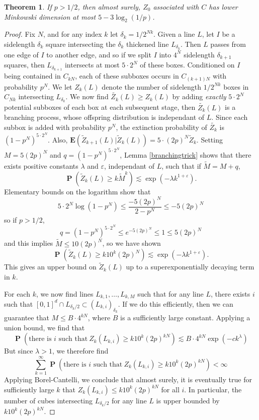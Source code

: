 \documentclass[dvipsnames,letterpaper,12pt]{article}
\numberwithin{equation}{section}
\theoremstyle{plain}
\newtheorem{theorem}{Theorem}
\DeclareMathOperator{\Prob}{\mathbf{P}}
\begin{document}
\begin{theorem}
	If $p > 1/2$, then almost surely, $Z_0$ associated with $C$ has lower Minkowski dimension at most $5 - 3 \log_2(1/p)$.
\end{theorem}
\begin{proof}
	Fix $N$, and for any index $k$ let $\delta_k = 1/2^{Nk}$. Given a line $L$, let $I$ be a sidelength $\delta_k$ square intersecting the $\delta_k$ thickened line $L_{\delta_k}$. Then $L$ passes from one edge of $I$ to another edge, and so if we split $I$ into $4^N$ sidelength $\delta_{k+1}$ squares, then $L_{\delta_{k+1}}$ intersects at most $5 \cdot 2^N$ of these boxes. Conditioned on $I$ being contained in $C_{kN}$, each of these subboxes occurs in $C_{(k+1)N}$ with probability $p^N$. We let $Z_k(L)$ denote the number of sidelength $1/2^{Nk}$ boxes in $C_{Nk}$ intersecting $L_{\delta_k}$. We now find $\tilde{Z_k}(L) \geq Z_k(L)$ by adding {\it exactly} $5 \cdot 2^N$ potential subboxes of each box at each subsequent stage, then $\tilde{Z_k}(L)$ is a branching process, whose offspring distribution is independant of $L$. Since each subbox is added with probability $p^N$, the extinction probability of $\tilde{Z_k}$ is $(1 - p^N)^{5 \cdot 2^N}$. Also, $\mathbf{E}(\tilde{Z}_{k+1}(L)|\tilde{Z}_k(L)) = 5 \cdot (2p)^N \tilde{Z}_k$.  Setting $M = 5 (2p)^N$ and $q = (1 - p^N)^{5 \cdot 2^N}$, Lemma \ref{branchingtrick} shows that there exists positive constants $\lambda$ and $\varepsilon$, independant of $L$, such that if $\tilde{M} = M + q$,
	\[ \Prob \left( \tilde{Z}_k(L) \geq k \tilde{M}^k \right) \lesssim \exp(- \lambda k^{1 + \varepsilon}). \]
	Elementary bounds on the logarithm show that
	\[ 5 \cdot 2^N \log(1 - p^N) \leq \frac{-5 (2p)^N}{2 - p^N} \leq -5(2p)^N \]
	so if $p > 1/2$,
	\[ q = (1 - p^N)^{5 \cdot 2^N} \leq e^{-5 (2p)^N} \leq 1 \leq 5(2p)^N \]
	and this implies $\tilde{M} \leq 10 (2p)^N$, so we have shown
	\[ \Prob ( \tilde{Z}_k(L) \geq k 10^k (2p)^N) \lesssim \exp( - \lambda k^{1 + \varepsilon}). \]
	This gives an upper bound on $\tilde{Z}_k(L)$ up to a superexponentially decaying term in $k$.

	For each $k$, we now find lines $L_{k,1}, \dots, L_{k,M}$ such that for any line $L$, there exists $i$ such that $[0,1]^d \cap L_{\delta_k/2} \subset (L_{k,i})_{\delta_k}$. If we do this efficiently, then we can guarantee that $M \leq B \cdot 4^{kN}$, where $B$ is a sufficiently large constant. Applying a union bound, we find that
	\[ \Prob \left( \text{there is $i$ such that}\ Z_k(L_{k,i}) \geq k 10^k (2p)^{kN} \right) \lesssim B \cdot 4^{kN} \exp(-c k^\lambda) \]
	But since $\lambda > 1$, we therefore find
	\[ \sum_{k = 1}^\infty \Prob \left( \text{there is $i$ such that}\ Z_k(L_{k,i}) \geq k 10^k (2p)^{kN} \right) < \infty \]
	Applying Borel-Cantelli, we conclude that almost surely, it is eventually true for sufficiently large $k$ that $Z_k(L_{k,i}) \leq k 10^k (2p)^{kN}$ for all $i$. In particular, the number of cubes intersecting $L_{\delta_k/2}$ for any line $L$ is upper bounded by $k10^k (2p)^{kN}$.


\end{proof}
\end{document}
